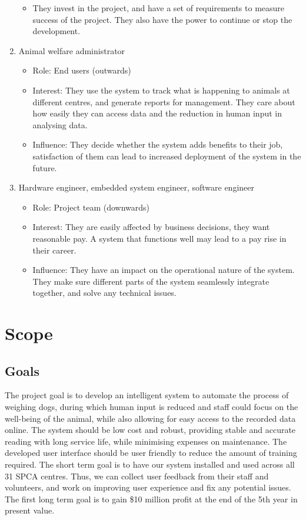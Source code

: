 \begin{enumerate}
\begin{itemize}
        \item They invest in the project, and have a set of requirements to measure success of the project. They also have the power to continue or stop the development.
    \end{itemize}
    \item Animal welfare administrator
    \begin{itemize}
        \item Role: End users (outwards)
        \item Interest: They use the system to track what is happening to animals at different centres, and generate reports for management. They care about how easily they can access data and the reduction in human input in analysing data.
        \item Influence: They decide whether the system adds benefits to their job, satisfaction of them can lead to increased deployment of the system in the future.
    \end{itemize}
    \item Hardware engineer, embedded system engineer, software engineer
    \begin{itemize}
        \item Role: Project team (downwards)
        \item Interest: They are easily affected by business decisions, they want reasonable pay. A system that functions well may lead to a pay rise in their career.
        \item Influence: They have an impact on the operational nature of the system. They make sure different parts of the system seamlessly integrate together, and solve any technical issues.
    \end{itemize}
\end{enumerate}

\section{Scope}
\subsection{Goals}
The project goal is to develop an intelligent system to automate the process of weighing dogs, during which human input is reduced and staff could focus on the well-being of the animal, while also allowing for easy access to the recorded data online. The system should be low cost and robust, providing stable and accurate reading with long service life, while minimising expenses on maintenance. The developed user interface should be user friendly to reduce the amount of training required. The short term goal is to have our system installed and used across all 31 SPCA centres. Thus, we can collect user feedback from their staff and volunteers, and work on improving user experience and fix any potential issues. The first long term goal is to gain \$10 million profit at the end of the 5th year in present value.

